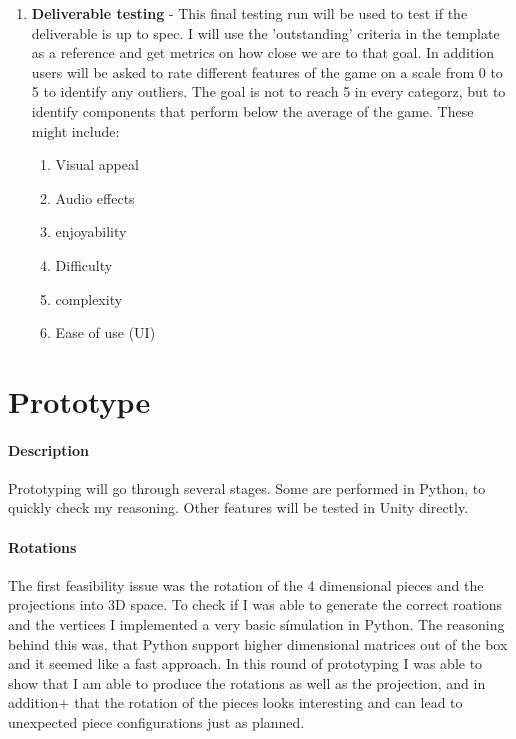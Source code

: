 \documentclass{article}
\begin{document}
\begin{enumerate}
    \item \textbf{Deliverable testing} - This final testing run will be used to test if the deliverable is up to spec. I will use the 'outstanding' criteria in the template as a reference and get metrics on how close we are to that goal. In addition users will be asked to rate different features of the game on a scale from 0 to 5 to identify any outliers. The goal is not to reach 5 in every categorz, but to identify components that perform below the average of the game. These might include:
            \begin{enumerate}
                \item Visual appeal
                \item Audio effects
                \item enjoyability
                \item Difficulty
                \item complexity
                \item Ease of use (UI)
            \end{enumerate}

    
\end{enumerate}

\section{Prototype}
\paragraph{Description}
Prototyping will go through several stages. Some are performed in Python, to quickly check my reasoning. Other features will be tested in Unity directly.
\paragraph{Rotations}
The first feasibility issue was the rotation of the 4 dimensional pieces and the projections into 3D space. To check if I was able to generate the correct roations and the vertices I implemented a very basic símulation in Python. The reasoning
behind this was, that Python support higher dimensional matrices out of the box and it seemed like a fast approach. In this round of prototyping I was able to show that I am able to produce the rotations as well as the projection, and in addition+
that the rotation of the pieces looks interesting and can lead to unexpected piece configurations just as planned.
\end{document}
